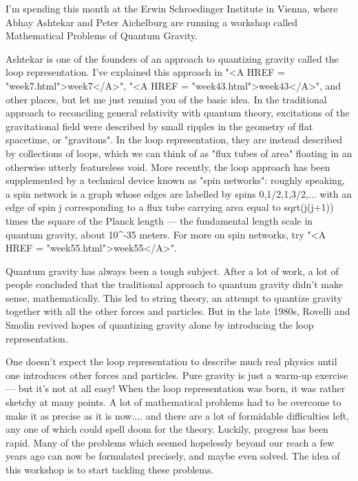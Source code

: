 



I'm spending this month at the Erwin Schroedinger Institute in Vienna,
where Abhay Ashtekar and Peter Aichelburg are running a workshop called 
Mathematical Problems of Quantum Gravity.  

Ashtekar is one of the founders of an approach to quantizing gravity
called the loop representation.  I've explained this approach in
"<A HREF = "week7.html">week7</A>", "<A HREF = "week43.html">week43</A>", and other places, but let me just remind you of the
basic idea.  In the traditional approach to reconciling general
relativity with quantum theory, excitations of the gravitational field
were described by small ripples in the geometry of flat spacetime, or
"gravitons".  In the loop representation, they are instead described
by collections of loops, which we can think of as "flux tubes of area"
floating in an otherwise utterly featureless void.  More recently, the
loop approach has been supplemented by a technical device known as
"spin networks": roughly speaking, a spin network is a graph whose
edges are labelled by spins 0,1/2,1,3/2,... with an edge of spin j
corresponding to a flux tube carrying area equal to sqrt(j(j+1)) times
the square of the Planck length --- the fundamental length scale in
quantum gravity, about 10^{-35} meters.  For more on spin networks,
try "<A HREF = "week55.html">week55</A>".

Quantum gravity has always been a tough subject.  After a lot of work,
a lot of people concluded that the traditional approach to quantum
gravity didn't make sense, mathematically.  This led to string theory,
an attempt to quantize gravity together with all the other forces and
particles.  But in the late 1980s, Rovelli and Smolin revived hopes of
quantizing gravity alone by introducing the loop representation.  

One doesn't expect the loop representation to describe much real physics
until one introduces other forces and particles.  Pure gravity is just
a warm-up exercise --- but it's not at all easy!  When the loop
representation was born, it was rather sketchy at many points.  A lot
of mathematical problems had to be overcome to make it as precise as
it is now.... and there are a lot of formidable difficulties left, any
one of which could spell doom for the theory.  Luckily, progress has
been rapid.  Many of the problems which seemed hopelessly beyond our
reach a few years ago can now be formulated precisely, and maybe even
solved.  The idea of this workshop is to start tackling these
problems.

